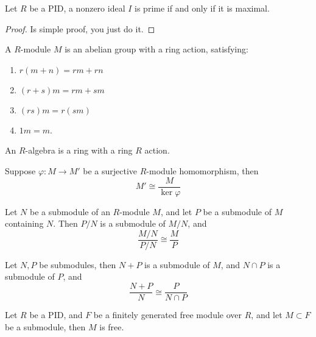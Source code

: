 \documentclass[openany]{book}
\begin{document}
\begin{prop}[*]
    Let $R$ be a PID, a nonzero ideal $I$ is prime if and only if it is maximal.
\end{prop}
\begin{proof}
    Is simple proof, you just do it.
\end{proof}

\begin{defn}[module]
    A $R$-module $M$ is an abelian group with a ring action, satisfying:
    \begin{enumerate}
        \item $r(m+n)=rm+rn$
        \item $(r+s)m=rm+sm$
        \item $(rs)m=r(sm)$
        \item $1m=m$.
    \end{enumerate}
\end{defn}

\begin{defn}
    An $R$-algebra is a ring with a ring $R$ action.
\end{defn}

\begin{thm}
    Suppose $\varphi: M\to M'$ be a surjective $R$-module homomorphism, then 
    \begin{equation*}
        M'\cong\frac{M}{\ker\varphi}
    \end{equation*}
\end{thm}

\begin{prop}
    Let $N$ be a submodule of an $R$-module $M$, and let $P$ be a submodule of $M$ containing $N$. Then $P/N$ is a submodule of $M/N$, and 
    \begin{equation*}
        \frac{M/N}{P/N}\cong\frac{M}{P}
    \end{equation*}
\end{prop}

\begin{prop}
    Let $N,P$ be submodules, then $N+P$ is a submodule of $M$, and $N\cap P$ is a submodule of $P$, and 
    \begin{equation*}
        \frac{N+P}{N}\cong\frac{P}{N\cap P}
    \end{equation*}
\end{prop}


\begin{prop}
    Let $R$ be a PID, and $F$ be a finitely generated free module over $R$, and let $M\subset F$ be a submodule, then $M$ is free.
\end{prop}
\end{document}
